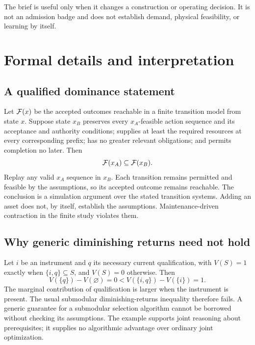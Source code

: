 The brief is useful only when it changes a construction or operating decision. It is not an admission badge and does not establish demand, physical feasibility, or learning by itself.

\clearpage
\section{Formal details and interpretation}
\label{app:formal}

\subsection{A qualified dominance statement}

Let $\mathcal{F}(x)$ be the accepted outcomes reachable in a finite transition model from state $x$. Suppose state $x_B$ preserves every $x_A$-feasible action sequence and its acceptance and authority conditions; supplies at least the required resources at every corresponding prefix; has no greater relevant obligations; and permits completion no later. Then
\begin{equation}
\mathcal{F}(x_A)\subseteq\mathcal{F}(x_B).
\end{equation}
Replay any valid $x_A$ sequence in $x_B$. Each transition remains permitted and feasible by the assumptions, so its accepted outcome remains reachable. The conclusion is a simulation argument over the stated transition systems. Adding an asset does not, by itself, establish the assumptions. Maintenance-driven contraction in the finite study violates them.

\subsection{Why generic diminishing returns need not hold}

Let $i$ be an instrument and $q$ its necessary current qualification, with $V(S)=1$ exactly when $\{i,q\}\subseteq S$, and $V(S)=0$ otherwise. Then
\begin{equation}
V(\{q\})-V(\varnothing)=0
<V(\{i,q\})-V(\{i\})=1.
\end{equation}
The marginal contribution of qualification is larger when the instrument is present. The usual submodular diminishing-returns inequality therefore fails. A generic guarantee for a submodular selection algorithm cannot be borrowed without checking its assumptions. The example supports joint reasoning about prerequisites; it supplies no algorithmic advantage over ordinary joint optimization.

